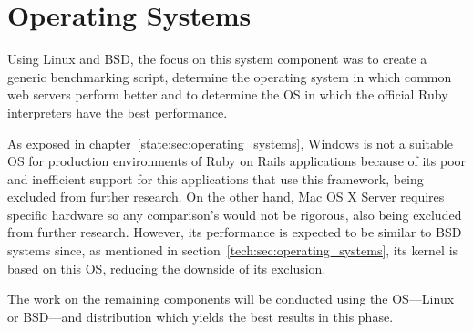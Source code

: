 \section{Operating Systems} %
\label{solution:sec:operating_systems}

Using Linux and BSD, the focus on this system component was to create a generic benchmarking script, determine the operating system in which common web servers perform better and to determine the OS in which the official Ruby interpreters have the best performance.

As exposed in chapter~\ref{state:sec:operating_systems}, Windows is not a suitable OS for production environments of Ruby on Rails applications because of its poor and inefficient support for this applications that use this framework, being excluded from further research. On the other hand, Mac OS X Server requires specific hardware so any comparison's would not be rigorous, also being excluded from further research. However, its performance is expected to be similar to BSD systems since, as mentioned in section~\ref{tech:sec:operating_systems}, its kernel is based on this OS, reducing the downside of its exclusion. 

The work on the remaining components will be conducted using the OS---Linux or BSD---and distribution which yields the best results in this phase.


